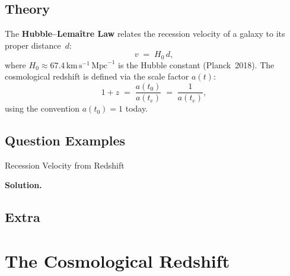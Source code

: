 \documentclass[12pt, a4paper, openright]{report}
\newcommand{\Mpc}{\,\mathrm{Mpc}}
\newcommand{\kms}{\,\mathrm{km\,s^{-1}}}
\begin{document}
\begin{intuition}
\lipsum[1][1-4]   %
\end{intuition}

\subsection{Theory}

\begin{theory}
\lipsum[2][1-3]   %

The \textbf{Hubble–Lemaître Law} relates the recession velocity of a galaxy to its
proper distance~$d$:
\begin{equation}
  v \;=\; H_0 \, d,
  \label{eq:hubble}
\end{equation}
where $H_0 \approx 67.4 \kms\Mpc^{-1}$ is the Hubble constant (Planck~2018).
The cosmological redshift is defined via the scale factor $a(t)$:
\begin{equation}
  1 + z \;=\; \frac{a(t_0)}{a(t_e)} \;=\; \frac{1}{a(t_e)},
  \label{eq:redshift}
\end{equation}
using the convention $a(t_0)=1$ today.

\lipsum[2][4-5]   %
\end{theory}

\subsection{Question Examples}

\begin{example}{Recession Velocity from Redshift}{}
\lipsum[3][1-2]   %

\medskip\textbf{Solution.}\quad
\lipsum[3][3-4]   %
\end{example}

\subsection{Extra}

\begin{extra}
\lipsum[4][1-2]   %
\end{extra}

\section{The Cosmological Redshift}
\end{document}
